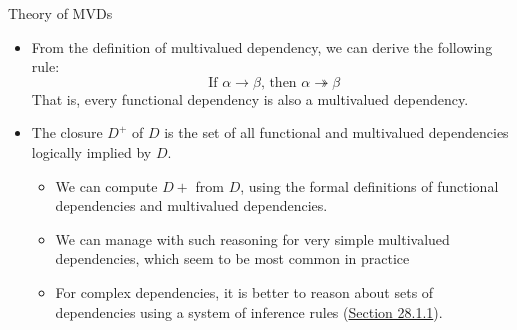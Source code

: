 \documentclass[aspectratio=169]{beamer}
\begin{document}
%
%

\begin{frame}{Theory of MVDs}
    \begin{itemize}
        \item From the definition of multivalued dependency, we can derive the following rule:
            \begin{equation*}
                \text{ If } \alpha \rightarrow \beta \text{, then } \alpha \twoheadrightarrow \beta
            \end{equation*}
            That is, every functional dependency is also a multivalued dependency.

        \item The closure $D^+$ of $D$ is the set of all functional and multivalued dependencies logically implied by $D$.
            \begin{itemize}
                \item We can compute $D+$ from $D$, using the formal definitions of functional dependencies and multivalued dependencies.
                \item We can manage with such reasoning for very simple multivalued dependencies, which seem to be most common in practice
                \item For complex dependencies, it is better to reason about sets of dependencies using a system of inference rules (\href{https://db-book.com/online-chapters-dir/28.pdf}{Section 28.1.1}).
            \end{itemize}
    \end{itemize}
\end{frame}
\end{document}
